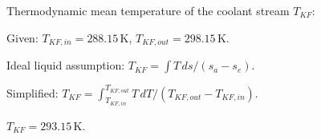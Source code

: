 Thermodynamic mean temperature of the coolant stream \( T_{KF} \):  

Given:  
\( T_{KF,in} = 288.15 \, \text{K} \), \( T_{KF,out} = 298.15 \, \text{K} \).  

Ideal liquid assumption:  
\( T_{KF} = \int T \, ds / (s_a - s_e) \).  

Simplified:  
\( T_{KF} = \int_{T_{KF,in}}^{T_{KF,out}} T \, dT / (T_{KF,out} - T_{KF,in}) \).  

\( T_{KF} = 293.15 \, \text{K} \).